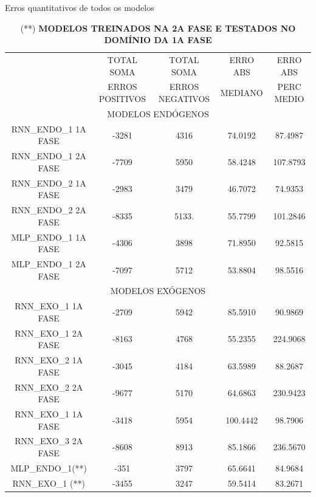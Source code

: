 \begin{table}[!ht]
        \caption{Erros quantitativos de todos os modelos}
        \begin{adjustbox}{width=\columnwidth,center}
           \begin{tabular}{ | c | c| c | c| c | }
     \rowcolor{gray!50}
    \multirow{2}{*}{	MODELO} & TOTAL SOMA  & TOTAL SOMA  & ERRO ABS & ERRO ABS \\ \rowcolor{gray!50}
   &                         ERROS POSITIVOS &  ERROS NEGATIVOS &  MEDIANO&  PERC MEDIO \\ 
    \multicolumn{5}{c}{	MODELOS ENDÓGENOS }  \\ \hline
RNN\_ENDO\_1 1A FASE & -3281 & 4316 & 74.0192 & 87.4987 \\ \hline
	RNN\_ENDO\_1 2A FASE & -7709 & 5950 & 58.4248 & 107.8793 \\ \hline
	RNN\_ENDO\_2 1A FASE & -2983 & 3479 & 46.7072 & 74.9353 \\ \hline
	RNN\_ENDO\_2 2A FASE & -8335 & 5133. & 55.7799 & 101.2846 \\ \hline
	MLP\_ENDO\_1 1A FASE & -4306 & 3898 & 71.8950 & 92.5815 \\ \hline
	MLP\_ENDO\_1 2A FASE & -7097 & 5712 & 53.8804 & 98.5516 \\ \hline
	\multicolumn{5}{c}{ MODELOS EXÓGENOS }\\ \hline
RNN\_EXO\_1 1A FASE & -2709 & 5942 & 85.5910 & 90.9869 \\ \hline
	RNN\_EXO\_1 2A FASE & -8163 & 4768 & 55.2355 & 224.9068 \\ \hline
	RNN\_EXO\_2 1A FASE & -3045 & 4184 & 63.5989 & 88.2687 \\ \hline
	RNN\_EXO\_2 2A FASE & -9677 & 5170 & 64.6863 & 230.9423 \\ \hline
	RNN\_EXO\_1 1A FASE & -3418 & 5954 & 100.4442 & 98.7906 \\ \hline
	RNN\_EXO\_3 2A FASE & -8608 & 8913 & 85.1866 & 236.5670 \\ \hline
	MLP\_ENDO\_1(**) & -351 & 3797 & 65.6641 & 84.9684 \\ \hline
	RNN\_EXO\_1  (**) & -3455 & 3247 & 59.5414 & 83.2671\\ \hline
\end{tabular} \end{adjustbox}\caption*{(**) \textbf{MODELOS TREINADOS NA 2A FASE E TESTADOS NO DOMÍNIO DA 1A FASE}} \end{table} 

